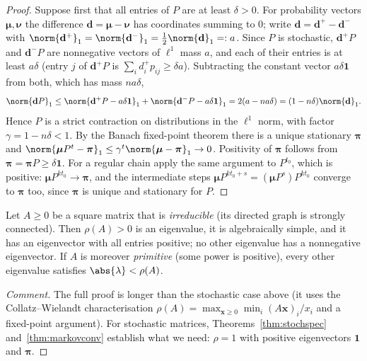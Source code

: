 \begin{proof}
Suppose first that all entries of $P$ are at least $\delta>0$. For probability vectors $\boldsymbol\mu,\boldsymbol\nu$ the difference $\mathbf{d}=\boldsymbol\mu-\boldsymbol\nu$ has coordinates summing to $0$; write $\mathbf{d}=\mathbf{d}^+-\mathbf{d}^-$ with $\norm{\mathbf{d}^+}_1=\norm{\mathbf{d}^-}_1=\tfrac12\norm{\mathbf{d}}_1=:a$. Since $P$ is stochastic, $\mathbf{d}^+P$ and $\mathbf{d}^-P$ are nonnegative vectors of $\ell^1$ mass $a$, and each of their entries is at least $a\delta$ (entry $j$ of $\mathbf{d}^+P$ is $\sum_id^+_ip_{ij}\ge\delta a$). Subtracting the constant vector $a\delta\mathbf{1}$ from both, which has mass $na\delta$,
\[ \norm{\mathbf{d}P}_1\le\norm{\mathbf{d}^+P-a\delta\mathbf{1}}_1+\norm{\mathbf{d}^-P-a\delta\mathbf{1}}_1=2(a-na\delta)=(1-n\delta)\norm{\mathbf{d}}_1. \]
Hence $P$ is a strict contraction on distributions in the $\ell^1$ norm, with factor $\gamma=1-n\delta<1$. By the Banach fixed-point theorem there is a unique stationary $\boldsymbol\pi$ and $\norm{\boldsymbol\mu P^t-\boldsymbol\pi}_1\le\gamma^t\norm{\boldsymbol\mu-\boldsymbol\pi}_1\to0$. Positivity of $\boldsymbol\pi$ follows from $\boldsymbol\pi=\boldsymbol\pi P\ge\delta\mathbf{1}$. For a regular chain apply the same argument to $P^{t_0}$, which is positive: $\boldsymbol\mu P^{kt_0}\to\boldsymbol\pi$, and the intermediate steps $\boldsymbol\mu P^{kt_0+s}=(\boldsymbol\mu P^s)P^{kt_0}$ converge to $\boldsymbol\pi$ too, since $\boldsymbol\pi$ is unique and stationary for $P$.
\end{proof}

\begin{theorem}\label{thm:pf}
Let $A\ge0$ be a square matrix that is \emph{irreducible} (its directed graph is strongly connected). Then $\rho(A)>0$ is an eigenvalue, it is algebraically simple, and it has an eigenvector with all entries positive; no other eigenvalue has a nonnegative eigenvector. If $A$ is moreover \emph{primitive} (some power is positive), every other eigenvalue satisfies $\abs{\lambda}<\rho(A)$.
\end{theorem}

\begin{proof}[Comment]
The full proof is longer than the stochastic case above (it uses the Collatz--Wielandt characterisation $\rho(A)=\max_{\mathbf{x}\ge0}\min_i(A\mathbf{x})_i/x_i$ and a fixed-point argument). For stochastic matrices, Theorems~\ref{thm:stochspec} and~\ref{thm:markovconv} establish what we need: $\rho=1$ with positive eigenvectors $\mathbf{1}$ and $\boldsymbol\pi$.
\end{proof}

